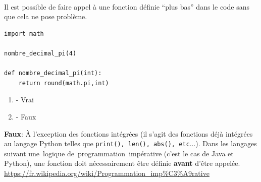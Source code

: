 \begin{Exercice}[2 minutes]\\
Il est possible de faire appel à une fonction définie ``plus bas'' dans le code sans que cela ne pose problème.

\begin{lstlisting}
import math

nombre_decimal_pi(4)

def nombre_decimal_pi(int):
    return round(math.pi,int)
\end{lstlisting}

\begin{enumerate}[label=\Alph*]
    \item - Vrai
    \item - Faux
\end{enumerate}
\begin{solution}
    \textbf{Faux}: À l'exception des fonctions intégrées (il s'agit des fonctions déjà intégrées au langage Python telles que \lstinline{print(), len(), abs(), etc}...). Dans les langages suivant une~logique de~programmation~impérative (c'est le cas de Java et Python), une fonction doit nécessairement être définie \textbf{avant} d'être appelée.
    \url{https://fr.wikipedia.org/wiki/Programmation\_imp\%C3\%A9rative}
\end{solution}
\end{Exercice}


